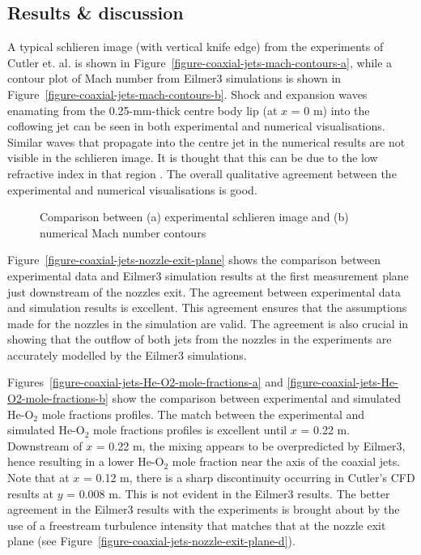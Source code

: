 \subsection{Results \& discussion}
%
A typical schlieren image (with vertical knife edge) from the
experiments of Cutler et. al. \cite{Cutler2006} is shown in Figure~\ref{figure-coaxial-jets-mach-contours-a},
while a contour plot of Mach number from Eilmer3 simulations is
shown in Figure~\ref{figure-coaxial-jets-mach-contours-b}.
Shock and expansion waves enamating from the 0.25-mm-thick centre
body lip (at $x$ = 0 m) into the coflowing jet can be seen in both 
experimental and numerical visualisations. Similar waves that
propagate into the centre jet in the numerical results are not 
visible in the schlieren image. It is thought that this can be
due to the low refractive index in that region \cite{Cutler2006}.
The overall qualitative agreement between the experimental
and numerical visualisations is good.  
\begin{figure}[h]
 \centering
 \caption{Comparison between (a) experimental schlieren image and 
          (b) numerical Mach number contours}
 \label{figure-coaxial-jets-mach-contours}
\end{figure}

Figure~\ref{figure-coaxial-jets-nozzle-exit-plane} shows the comparison between
experimental data and Eilmer3 simulation results at the first 
measurement plane just downstream of the nozzles exit. The agreement
between experimental data and simulation results is excellent. This agreement 
ensures that the assumptions made for the nozzles in the simulation are valid. 
The agreement is also crucial in showing that the outflow of both jets from 
the nozzles in the experiments are accurately modelled by the Eilmer3 simulations.

Figures~\ref{figure-coaxial-jets-He-O2-mole-fractions-a} and
\ref{figure-coaxial-jets-He-O2-mole-fractions-b} show the comparison
between experimental and simulated He-O$_2$ mole fractions profiles. The 
match between the experimental and simulated He-O$_2$ mole fractions
profiles is excellent until $x$ = 0.22 m. Downstream of $x$ = 0.22 m,
the mixing appears to be overpredicted by Eilmer3, hence resulting in a lower
He-O$_2$ mole fraction near the axis of the coaxial jets. Note that at
$x$ = 0.12 m, there is a sharp discontinuity occurring in Cutler's CFD
results at $y$ = 0.008 m. This is not evident in the Eilmer3 results.
The better agreement in the Eilmer3 results with the experiments is brought
about by the use of a freestream turbulence intensity that matches that at 
the nozzle exit plane (see Figure~\ref{figure-coaxial-jets-nozzle-exit-plane-d}).

